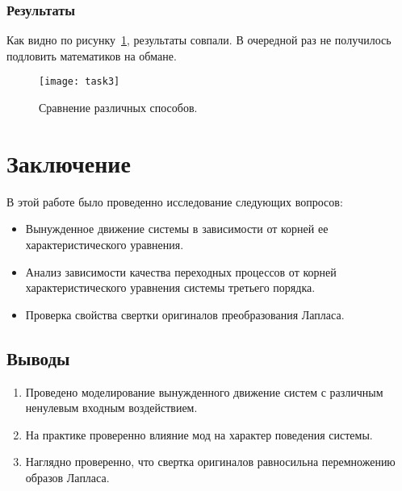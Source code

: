 \documentclass[16pt]{article}
\begin{document}
\subsubsection{Результаты}
Как видно по рисунку~\ref{fig:fig7}, результаты совпали. В очередной раз не получилось подловить математиков на обмане.
\begin{figure}[h]
    \centering
    \texttt{[image: task3]}
    \caption{Сравнение различных способов.}
    \label{fig:fig7}
\end{figure}

\newpage
\section{Заключение}
В этой работе было проведенно исследование следующих вопросов:
\begin{itemize}
    \item Вынужденное движение системы в зависимости от корней ее характеристического уравнения. 
    \item Анализ зависимости качества переходных процессов от корней характеристического уравнения системы третьего порядка. 
    \item Проверка свойства свертки оригиналов преобразования Лапласа. 
\end{itemize} 
\subsection{Выводы}
\begin{enumerate}
   \item Проведено моделирование вынужденного движение систем с различным ненулевым входным воздействием.
   \item На практике проверенно влияние мод на характер поведения системы.
   \item Наглядно проверенно, что свертка оригиналов равносильна перемножению образов Лапласа.
\end{enumerate}
\end{document}
